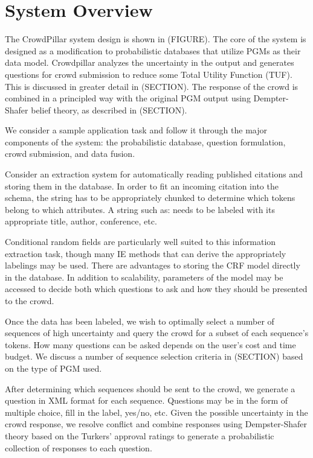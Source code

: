 \section{System Overview}

The CrowdPillar system design is shown in (FIGURE). The core of the system is designed as a modification to probabilistic databases that utilize PGMs as their data model.  Crowdpillar analyzes the uncertainty in the output and generates questions for crowd submission to reduce some Total Utility Function (TUF).  This is discussed in greater detail in (SECTION).  The response of the crowd is combined in a principled way with the original PGM output using Dempter-Shafer belief theory, as described in (SECTION).

We consider a sample application task and follow it through the major components of the system: the probabilistic database, question formulation, crowd submission, and data fusion.

Consider an extraction system for automatically reading published citations and storing them in the database.  In order to fit an incoming citation into the schema, the string has to be appropriately chunked to determine which tokens belong to which attributes.  A string such as:
needs to be labeled with its appropriate title, author, conference, etc.

Conditional random fields are particularly well suited to this information extraction task, though many IE methods that can derive the appropriately labelings may be used.  There are advantages to storing the CRF model directly in the database.  In addition to scalability, parameters of the model may be accessed to decide both which questions to ask and how they should be presented to the crowd.

Once the data has been labeled, we wish to optimally select a number of sequences of high uncertainty and query the crowd for a subset of each sequence's tokens.  How many questions can be asked depends on the user's cost and time budget.  We discuss a number of sequence selection criteria in (SECTION) based on the type of PGM used.

After determining which sequences should be sent to the crowd, we generate a question in XML format for each sequence.  Questions may be in the form of multiple choice, fill in the label, yes/no, etc.  Given the possible uncertainty in the crowd response, we resolve conflict and combine responses using Dempster-Shafer theory based on the Turkers' approval ratings to generate a probabilistic collection of responses to each question.

